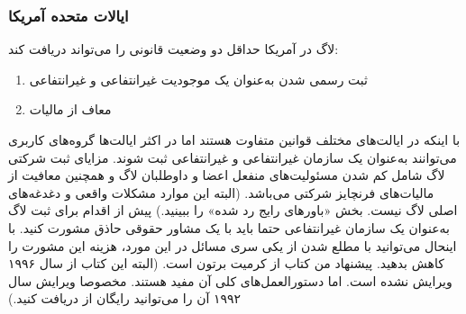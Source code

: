 \subsubsection{ایالات متحده آمریکا}
لاگ در آمریکا حداقل دو وضعیت قانونی را می‌تواند دریافت کند:

\begin{enumerate}
\item
ثبت رسمی شدن به‌عنوان یک موجودیت غیرانتفاعی و غیرانتفاعی
\item
معاف از مالیات
\end{enumerate}

با اینکه در ایالت‌های مختلف قوانین متفاوت هستند اما در اکثر ایالت‌ها
گروه‌های کاربری می‌توانند به‌عنوان یک سازمان غیرانتفاعی و غیرانتفاعی ثبت شوند.
مزایای ثبت شرکتی لاگ شامل کم شدن مسئولیت‌های منفعل اعضا و داوطلبان لاگ
و همچنین معافیت از مالیات‌های فرنچایز شرکتی می‌باشد.
(البته این موارد مشکلات واقعی و دغدغه‌های اصلی لاگ نیست.
بخش «باورهای رایج رد شده» را ببینید.)
پیش از اقدام برای ثبت لاگ به‌عنوان یک سازمان غیرانتفاعی حتما
باید با یک مشاور حقوقی حاذق مشورت کنید. با اینحال می‌توانید با مطلع شدن
از یکی سری مسائل در این مورد، هزینه این مشورت را کاهش بدهید.
پیشنهاد من کتاب
از کرمیت برتون است. (البته این کتاب از سال ۱۹۹۶ ویرایش نشده است.
اما دستورالعمل‌های کلی آن مفید هستند. مخصوصا ویرایش سال ۱۹۹۲ آن
را می‌توانید رایگان از
دریافت کنید.)


